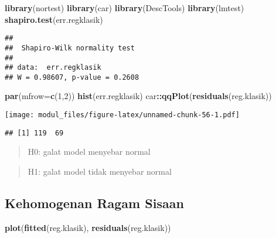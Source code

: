 \documentclass[
]{book}
\newenvironment{Shaded}{\begin{snugshade}}{\end{snugshade}}
\newcommand{\DataTypeTok}[1]{\textcolor[rgb]{0.13,0.29,0.53}{#1}}
\newcommand{\DecValTok}[1]{\textcolor[rgb]{0.00,0.00,0.81}{#1}}
\newcommand{\KeywordTok}[1]{\textcolor[rgb]{0.13,0.29,0.53}{\textbf{#1}}}
\newcommand{\NormalTok}[1]{#1}
\newcommand{\OperatorTok}[1]{\textcolor[rgb]{0.81,0.36,0.00}{\textbf{#1}}}
\begin{document}
\begin{Shaded}
\begin{Highlighting}[]
\KeywordTok{library}\NormalTok{(nortest)}
\KeywordTok{library}\NormalTok{(car)}
\KeywordTok{library}\NormalTok{(DescTools)}
\KeywordTok{library}\NormalTok{(lmtest)}
\KeywordTok{shapiro.test}\NormalTok{(err.regklasik)}
\end{Highlighting}
\end{Shaded}

\begin{verbatim}
## 
##  Shapiro-Wilk normality test
## 
## data:  err.regklasik
## W = 0.98607, p-value = 0.2608
\end{verbatim}

\begin{Shaded}
\begin{Highlighting}[]
\KeywordTok{par}\NormalTok{(}\DataTypeTok{mfrow=}\KeywordTok{c}\NormalTok{(}\DecValTok{1}\NormalTok{,}\DecValTok{2}\NormalTok{))}
\KeywordTok{hist}\NormalTok{(err.regklasik)}
\NormalTok{car}\OperatorTok{::}\KeywordTok{qqPlot}\NormalTok{(}\KeywordTok{residuals}\NormalTok{(reg.klasik))}
\end{Highlighting}
\end{Shaded}

\texttt{[image: modul\_files/figure-latex/unnamed-chunk-56-1.pdf]}

\begin{verbatim}
## [1] 119  69
\end{verbatim}

\begin{quote}
H0: galat model menyebar normal
\end{quote}

\begin{quote}
H1: galat model tidak menyebar normal
\end{quote}

\hypertarget{kehomogenan-ragam-sisaan}{%
\subsection{Kehomogenan Ragam Sisaan}\label{kehomogenan-ragam-sisaan}}

\begin{Shaded}
\begin{Highlighting}[]
\KeywordTok{plot}\NormalTok{(}\KeywordTok{fitted}\NormalTok{(reg.klasik), }\KeywordTok{residuals}\NormalTok{(reg.klasik))}
\end{Highlighting}
\end{Shaded}
\end{document}
